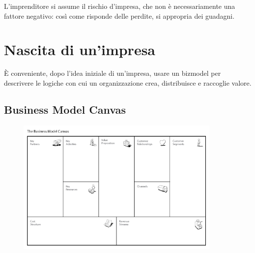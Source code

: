 \documentclass[10pt,a4paper,fleqn,oneside]{book}
\begin{document}
L'imprenditore si assume il rischio d'impresa, che non è necessariamente una
fattore negativo: così come risponde delle perdite, si appropria dei guadagni.

\section{Nascita di un'impresa}
È conveniente, dopo l'idea iniziale di un'impresa, usare un \gls{bizmodel} per
descrivere le logiche con cui un organizzazione crea, distribuisce e raccoglie
valore.

\subsection{Business Model Canvas}

\begin{figure}[h]
    \centering
    \includegraphics[width=10cm]{business_model_canvas.png}
\end{figure}
\end{document}
